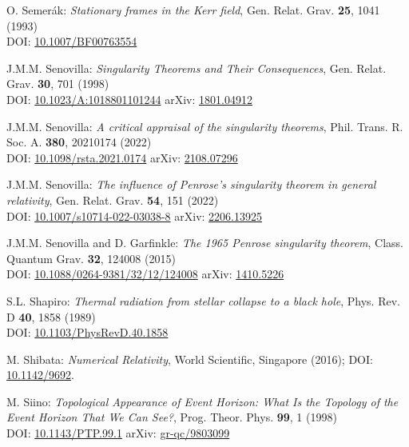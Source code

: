 \begin{thebibliography}{123}
O. Semer\'ak:
{\em Stationary frames in the Kerr field},
Gen. Relat. Grav. {\bf 25}, 1041 (1993)\\
DOI: \href{https://doi.org/10.1007/BF00763554}{10.1007/BF00763554}

J.M.M. Senovilla:
{\em Singularity Theorems and Their Consequences},
Gen. Relat. Grav. {\bf 30}, 701 (1998)\\
DOI: \href{https://doi.org/10.1023/A:1018801101244}{10.1023/A:1018801101244}\hfill
arXiv: \href{https://arxiv.org/abs/1801.04912}{1801.04912}

J.M.M. Senovilla:
{\em A critical appraisal of the singularity theorems},
Phil. Trans. R. Soc. A. {\bf 380}, 20210174 (2022)\\
DOI: \href{https://doi.org/10.1098/rsta.2021.0174}{10.1098/rsta.2021.0174}\hfill
arXiv: \href{https://arxiv.org/abs/2108.07296}{2108.07296}

J.M.M. Senovilla:
{\em The influence of Penrose’s singularity theorem in general relativity},
Gen. Relat. Grav.  {\bf 54}, 151 (2022)\\
DOI: \href{https://doi.org/10.1007/s10714-022-03038-8}{10.1007/s10714-022-03038-8}\hfill
arXiv: \href{https://arxiv.org/abs/2206.13925}{2206.13925}

J.M.M. Senovilla and D. Garfinkle:
{\em The 1965 Penrose singularity theorem},
Class. Quantum Grav. {\bf 32}, 124008 (2015)\\
DOI: \href{https://doi.org/10.1088/0264-9381/32/12/124008}{10.1088/0264-9381/32/12/124008}\hfill
arXiv: \href{https://arxiv.org/abs/1410.5226}{1410.5226}

S.L. Shapiro:
{\em Thermal radiation from stellar collapse to a black hole},
Phys. Rev. D {\bf 40}, 1858 (1989)\\
DOI: \href{https://doi.org/10.1103/PhysRevD.40.1858}{10.1103/PhysRevD.40.1858}

M. Shibata:
{\em Numerical Relativity},
World Scientific, Singapore (2016);
DOI: \href{https://doi.org/10.1142/9692}{10.1142/9692}.

M. Siino: {\em Topological Appearance of Event Horizon:
What Is the Topology of the Event Horizon That We Can See?},
Prog. Theor. Phys. {\bf 99}, 1 (1998)\\
DOI: \href{https://doi.org/10.1143/PTP.99.1}{10.1143/PTP.99.1}\hfill
arXiv: \href{https://arxiv.org/abs/gr-qc/9803099}{gr-qc/9803099}


\end{thebibliography}
